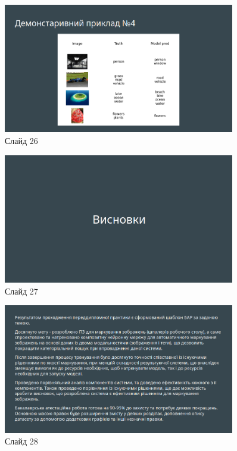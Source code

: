 \documentclass{udstu}
\begin{document}
\begin{figure}[!ht]
	\centering
	\includegraphics[width=0.9\textwidth]{PNG/present/present-26}
	\caption{Слайд 26}
\end{figure}

\begin{figure}[!ht]
	\centering
	\includegraphics[width=0.9\textwidth]{PNG/present/present-27}
	\caption{Слайд 27}
\end{figure}

\begin{figure}[!ht]
	\centering
	\includegraphics[width=0.9\textwidth]{PNG/present/present-28}
	\caption{Слайд 28}
\end{figure}
\end{document}
